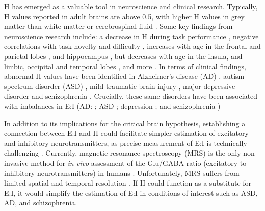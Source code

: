 \documentclass[
true
]{sn-jnl}
\begin{document}
H has emerged as a valuable tool in neuroscience and clinical research.
Typically, H values reported in adult brains are above 0.5, with higher
H values in grey matter than white matter or cerebrospinal fluid
\citep{dongHurstExponentAnalysis2018, winkMonofractalMultifractalDynamics2008}.
Some key findings from neuroscience research include: a decrease in H
during task performance
\citep{ciuciuInterplayFunctionalConnectivity2014, heScaleFreePropertiesFunctional2011},
negative correlations with task novelty and difficulty
\citep{churchillSuppressionScalefreeFMRI2016}, increases with age in the
frontal and parietal lobes \citep{dongHurstExponentAnalysis2018}, and
hippocampus \citep{winkAgeCholinergicEffects2006}, but decreases with
age in the insula, and limbic, occipital and temporal lobes
\citep{dongHurstExponentAnalysis2018}, and more
\citep{campbellMonofractalAnalysisFunctional2022}. In terms of clinical
findings, abnormal H values have been identified in Alzheimer's disease
(AD)
\citep{maximFractionalGaussianNoise2005, warsiCorrelatingBrainBlood2012},
autism spectrum disorder (ASD)
\citep{donaTemporalFractalAnalysis2017, laiShiftRandomnessBrain2010},
mild traumatic brain injury \citep{donaFractalAnalysisBrain2017}, major
depressive disorder
\citep{weiIdentifyingMajorDepressive2013, jingIdentifyingCurrentRemitted2017}
and schizophrenia \citep{sokunbiNonlinearComplexityAnalysis2014}.
Crucially, these same disorders have been associated with imbalances in
E:I (AD:
\citep{lauterbornIncreasedExcitatoryInhibitory2021, vicovarelaExcitatoryinhibitoryImbalanceAlzheimers2019};
ASD
\citep{sohalExcitationinhibitionBalanceFramework2019, uzunovaExcitatoryInhibitoryImbalance2016, bruiningMeasurementExcitationinhibitionRatio2020};
depression \citep{pagePrefrontalExcitatoryInhibitory2019}; and
schizophrenia \citep{kangInterplayMentalDisorder2019})

In addition to its implications for the critical brain hypothesis,
establishing a connection between E:I and H could facilitate simpler
estimation of excitatory and inhibitory neurotransmitters, as precise
measurement of E:I is technically challenging
\citep{ajramContribution1HMagnetic2019}. Currently, magnetic resonance
spectroscopy (MRS) is the only non-invasive method for \emph{in vivo}
assessment of the Glu/GABA ratio (excitatory to inhibitory
neurotransmitters) in humans
\citep{stanleyFunctionalMagneticResonance2018, harrisEdited1Magnetic2017}.
Unfortunately, MRS suffers from limited spatial and temporal resolution
\citep{gaoInferringSynapticExcitation2017, ajramContribution1HMagnetic2019, stanleyFunctionalMagneticResonance2018}.
If H could function as a substitute for E:I, it would simplify the
estimation of E:I in conditions of interest such as ASD, AD, and
schizophrenia.
\end{document}
